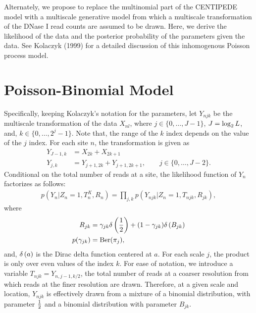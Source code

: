 \documentclass[reqno]{amsart}
\numberwithin{equation}{section}
\begin{document}
Alternately, we propose to replace the multinomial part of the CENTIPEDE model with a multiscale generative
model from which a multiscale transformation of the DNase I read counts are assumed to be drawn. Here, we derive the
likelihood of the data and the posterior probability of the parameters given the data. See
Kolaczyk (1999) for a detailed discussion of this inhomogenous Poisson process model.

\section{Poisson-Binomial Model}
Specifically, keeping Kolaczyk's notation for the parameters, let $Y_{njk}$ be the multiscale transformation of the
data $X_{nl}$, where $j \in \{0,\ldots,J-1\}$, $J=\log_2{L}$, and, $k \in \{0,\ldots,2^{j}-1\}$. Note that, the
range of the $k$ index depends on the value of the $j$ index. For each site $n$, the transformation is given as
\begin{align}
    Y_{J-1,k} &= X_{2k}+X_{2k+1} \\
    Y_{j,k} &= Y_{j+1,2k}+Y_{j+1,2k+1}, \qquad j \in \{0,\ldots,J-2\}.
\end{align}
Conditional on the total number of reads at a site, the likelihood function of $Y_n$ factorizes as follows:
\begin{align}
    p(Y_n | Z_n=1, T^X_n, R_n) = \prod_{j,k} p(Y_{njk} | Z_n=1, T_{njk}, R_{jk}),
\end{align}
where
\begin{align}
    R_{jk} &= \gamma_{jk} \delta \left(\frac{1}{2} \right) + (1 - \gamma_{jk}) \delta \left(B_{jk} \right) \\
    p(\gamma_{jk}) &= \mathrm{Ber}(\pi_j), \\
\end{align}
and, $\delta \left(a \right)$ is the Dirac delta function centered at $a$. 
For each scale $j$, the product is only over even values of the index $k$. For ease of notation, we introduce a variable
$T_{njk} = Y_{n,j-1,k/2}$, the total number of reads at a coarser resolution from which reads at the finer resolution are
drawn. Therefore, at a given scale and location, $Y_{njk}$ is effectively drawn from a mixture of
a binomial distribution, with parameter $\frac{1}{2}$ and a binomial distribution with parameter $B_{jk}$.
\end{document}
